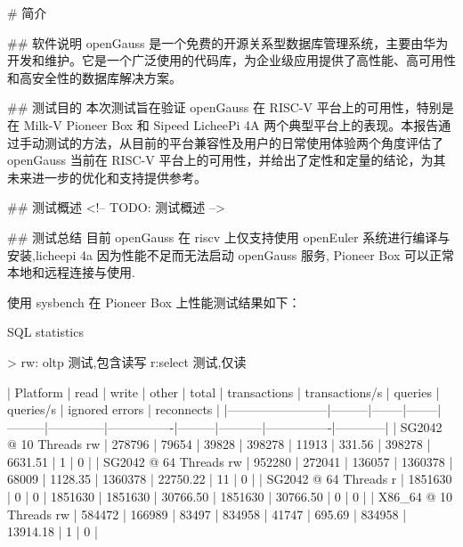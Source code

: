 \documentclass{article}
\begin{document}
\maketitle

\begin{abstract}
\end{abstract}

\thispagestyle{empty} %

\newpage
\tableofcontents

\newpage

\begin{markdown}

  # 简介

## 软件说明
openGauss 是一个免费的开源关系型数据库管理系统，主要由华为开发和维护。它是一个广泛使用的代码库，为企业级应用提供了高性能、高可用性和高安全性的数据库解决方案。

## 测试目的
本次测试旨在验证 openGauss 在 RISC-V 平台上的可用性，特别是在 Milk-V Pioneer Box 和 Sipeed LicheePi 4A 两个典型平台上的表现。本报告通过手动测试的方法，从目前的平台兼容性及用户的日常使用体验两个角度评估了 openGauss 当前在 RISC-V 平台上的可用性，并给出了定性和定量的结论，为其未来进一步的优化和支持提供参考。

## 测试概述
<!-- TODO: 测试概述 -->

## 测试总结
目前 openGauss 在 riscv 上仅支持使用 openEuler 系统进行编译与安装,licheepi 4a 因为性能不足而无法启动 openGauss 服务,
Pioneer Box 可以正常本地和远程连接与使用.

使用 sysbench 在 Pioneer Box 上性能测试结果如下：

SQL statistics

> rw: oltp 测试,包含读写 r:select 测试,仅读

| Platform               | read    | write  | other  | total   | transactions | transactions/s | queries | queries/s | ignored errors | reconnects |
|------------------------|---------|--------|--------|---------|--------------|----------------|---------|-----------|----------------|------------|
| SG2042 @ 10 Threads rw | 278796  | 79654  | 39828  | 398278  | 11913        | 331.56         | 398278  | 6631.51   | 1              | 0          |
| SG2042 @ 64 Threads rw | 952280  | 272041 | 136057 | 1360378 | 68009        | 1128.35        | 1360378 | 22750.22  | 11             | 0          |
| SG2042 @ 64 Threads r  | 1851630 | 0      | 0      | 1851630 | 1851630      | 30766.50       | 1851630 | 30766.50  | 0              | 0          |
| X86_64 @ 10 Threads rw | 584472  | 166989 | 83497  | 834958  | 41747        | 695.69         | 834958  | 13914.18  | 1              | 0          |


\end{markdown}
\end{document}
